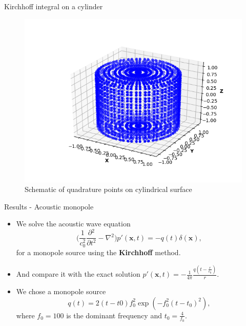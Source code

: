 \documentclass[10pt, aspectratio=169]{beamer}
\begin{document}
\begin{frame}{Kirchhoff integral on a cylinder}

	\begin{figure}
		\centering
		\includegraphics[scale=0.5]{images/quadpoints.png}
		\caption{Schematic of quadrature points on cylindrical surface}
	\end{figure}
\end{frame}


\begin{frame}{Results - Acoustic monopole}
	\begin{itemize}
		\item We solve the acoustic wave equation
		\begin{equation}
			\Bigg( \frac{1}{c_{0}^2}\frac{\partial{}^{2}}{\partial{t}^{2}}- \nabla{}^{2} \Bigg) p'(\mathbf{x}, t)  = -q(t)\delta(\mathbf{x}), 
		\end{equation}
		for a monopole source using the \textbf{Kirchhoff} method.
		\item And compare it with the exact solution $p'(\mathbf{x}, t) = -\frac{1}{4\pi} \frac{  q(t - \frac{r}{c_{0}}) }{r}$.
		\item We chose a monopole source
		\begin{equation}
			q(t) = 2(t - t0)f_{0}^{2}\exp( -f_{0}^2(t - t_{0})^{2}), 
		\end{equation}
		where $f_{0} = 100$ is the dominant frequency and $t_{0} = \frac{4}{f_{0}}$.
	\end{itemize}
\end{frame}
\end{document}
